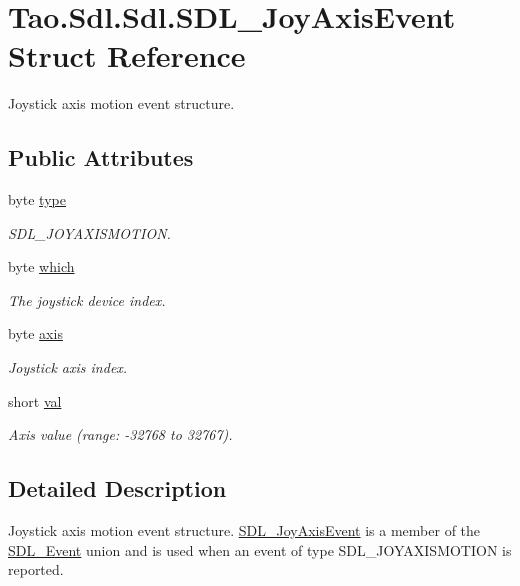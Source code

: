 \hypertarget{struct_tao_1_1_sdl_1_1_sdl_1_1_s_d_l___joy_axis_event}{
\section{Tao.Sdl.Sdl.SDL\_\-JoyAxisEvent Struct Reference}
\label{struct_tao_1_1_sdl_1_1_sdl_1_1_s_d_l___joy_axis_event}
}


Joystick axis motion event structure.  


\subsection*{Public Attributes}
\begin{DoxyCompactItemize}
\item 
byte \hyperlink{struct_tao_1_1_sdl_1_1_sdl_1_1_s_d_l___joy_axis_event_ae28dc8524a0c589e54e7fc31381d3279}{type}
\begin{DoxyCompactList}\small\item\em SDL\_\-JOYAXISMOTION. \item\end{DoxyCompactList}\item 
byte \hyperlink{struct_tao_1_1_sdl_1_1_sdl_1_1_s_d_l___joy_axis_event_acba47760d8072344474515532a6841c1}{which}
\begin{DoxyCompactList}\small\item\em The joystick device index. \item\end{DoxyCompactList}\item 
byte \hyperlink{struct_tao_1_1_sdl_1_1_sdl_1_1_s_d_l___joy_axis_event_a960c36c78c9a4a05890cdd20b191505f}{axis}
\begin{DoxyCompactList}\small\item\em Joystick axis index. \item\end{DoxyCompactList}\item 
short \hyperlink{struct_tao_1_1_sdl_1_1_sdl_1_1_s_d_l___joy_axis_event_a33ccbbcde34a6c14aa27f1eed7851dc1}{val}
\begin{DoxyCompactList}\small\item\em Axis value (range: -\/32768 to 32767). \item\end{DoxyCompactList}\end{DoxyCompactItemize}


\subsection{Detailed Description}
Joystick axis motion event structure. \hyperlink{struct_tao_1_1_sdl_1_1_sdl_1_1_s_d_l___joy_axis_event}{SDL\_\-JoyAxisEvent} is a member of the \hyperlink{struct_tao_1_1_sdl_1_1_s_d_l___event}{SDL\_\-Event} union and is used when an event of type SDL\_\-JOYAXISMOTION is reported. 

